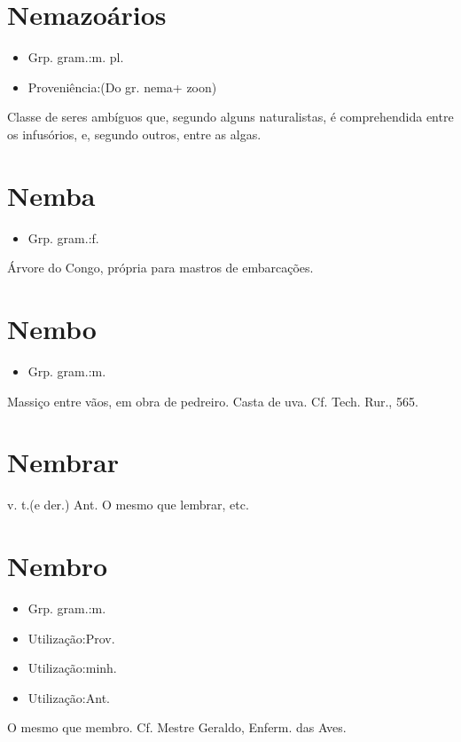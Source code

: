 \section{Nemazoários}
\begin{itemize}
\item {Grp. gram.:m. pl.}
\end{itemize}
\begin{itemize}
\item {Proveniência:(Do gr. \textunderscore nema\textunderscore  + \textunderscore zoon\textunderscore )}
\end{itemize}
Classe de seres ambíguos que, segundo alguns naturalistas, é comprehendida entre os infusórios, e, segundo outros, entre as algas.
\section{Nemba}
\begin{itemize}
\item {Grp. gram.:f.}
\end{itemize}
Árvore do Congo, própria para mastros de embarcações.
\section{Nembo}
\begin{itemize}
\item {Grp. gram.:m.}
\end{itemize}
Massiço entre vãos, em obra de pedreiro.
Casta de uva. Cf. \textunderscore Tech. Rur.\textunderscore , 565.
\section{Nembrar}
\textunderscore v. t.\textunderscore  (e der.) \textunderscore Ant.\textunderscore 
O mesmo que \textunderscore lembrar\textunderscore , etc.
\section{Nembro}
\begin{itemize}
\item {Grp. gram.:m.}
\end{itemize}
\begin{itemize}
\item {Utilização:Prov.}
\end{itemize}
\begin{itemize}
\item {Utilização:minh.}
\end{itemize}
\begin{itemize}
\item {Utilização:Ant.}
\end{itemize}
O mesmo que \textunderscore membro\textunderscore . Cf. Mestre Geraldo, \textunderscore Enferm. das Aves\textunderscore .
